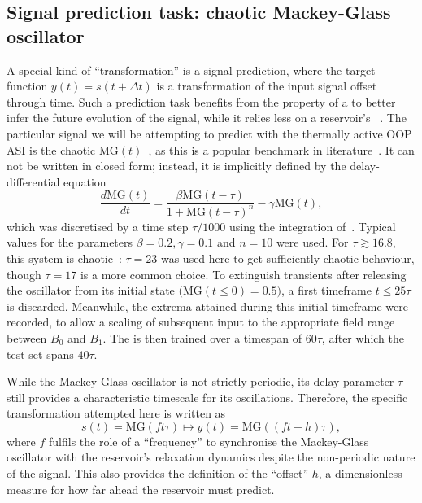 \subsection{Signal prediction task: chaotic Mackey-Glass oscillator}\label{sec:3:Thermal_Prediction}
A special kind of ``transformation'' is a signal prediction, where the target function $y(t) = s(t + \Delta t)$ is a transformation of the input signal offset through time.
Such a prediction task benefits from the  property of a  to better infer the future evolution of the signal, while it relies less on a reservoir's ~\cite{TaskAdaptivePRC,NeuromorphicFewShot}.
The particular signal we will be attempting to predict with the thermally active OOP ASI is the chaotic  $\mathrm{MG}(t)$~\cite{MackeyGlass}, as this is a popular benchmark in literature~\cite{RotatingNeuronsRC,NeuromorphicFewShot,TaskAdaptivePRC,Moon_2021,JaegerHaasWireless,ArchitecturalMarkovianESN}.
It can not be written in closed form; instead, it is implicitly defined by the delay-differential equation
\begin{equation}
	\label{eq:3:MG}
	\frac{d\mathrm{MG}(t)}{dt} = \frac{\beta \mathrm{MG}(t - \tau)}{1 + \mathrm{MG}(t - \tau)^n} - \gamma \mathrm{MG}(t) \mathrm{,}
\end{equation}
which was discretised by a time step $\tau/1000$ using the integration of~.
Typical values for the parameters $\beta=0.2, \gamma=0.1$ and $n=10$ were used.
For $\tau \gtrsim 16.8$, this system is chaotic~\cite{jaeger2001echo}: $\tau=23$ was used here to get sufficiently chaotic behaviour, though $\tau=17$ is a more common choice.
To extinguish transients after releasing the oscillator from its initial state $\big(\mathrm{MG}(t \leq 0) = 0.5\big)$, a first timeframe $t \leq 25\tau$ is discarded.
Meanwhile, the extrema attained during this initial timeframe were recorded, to allow a scaling of subsequent input to the appropriate field range between $B_0$ and $B_1$.
The  is then trained over a timespan of $60\tau$, after which the test set spans $40\tau$. \par
While the Mackey-Glass oscillator is not strictly periodic, its delay parameter $\tau$ still provides a characteristic timescale for its oscillations.
Therefore, the specific transformation attempted here is written as
\begin{equation}
	s(t) = \mathrm{MG}(ft\tau) \mapsto y(t) = \mathrm{MG}((ft + h)\tau) \mathrm{,}
\end{equation}
where $f$ fulfils the role of a ``frequency'' to synchronise the Mackey-Glass oscillator with the reservoir's relaxation dynamics despite the non-periodic nature of the signal.
This also provides the definition of the ``offset'' $h$, a dimensionless measure for how far ahead the reservoir must predict. \\\par

